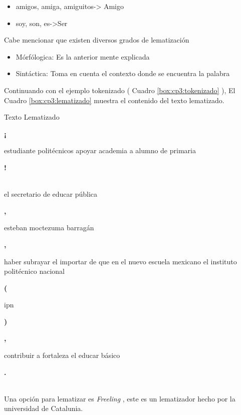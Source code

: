 	\begin{itemize}
		\item amigos, amiga, amiguitos-> Amigo
		\item soy, son, es->Ser
	\end{itemize}

Cabe mencionar que existen diversos grados de lematización

	\begin{itemize}
		\item Mórfólogica: Es la anterior mente explicada
		\item Sintáctica: Toma en cuenta el contexto donde se encuentra la palabra

	\end{itemize}

Continuando con el ejemplo tokenizado ( Cuadro \ref{box:cp3:tokenizado} ), El Cuadro \ref{box:cp3:lematizado} muestra el contenido del texto lematizado.\\

\begin{mygraybox}[label={box:cp3:lematizado}]{Texto Lematizado} 
\begin{large}\textbf{¡}\end{large} estudiante politécnicos apoyar academia a alumno de primaria \begin{large}\textbf{!}\end{large}\\

el secretario de educar pública \begin{Large}\textbf{,}\end{Large} esteban moctezuma barragán \begin{Large}\textbf{,}\end{Large} haber subrayar el importar  de que en el nuevo escuela mexicano el instituto politécnico nacional \begin{Large}\textbf{(}\end{Large} ipn \begin{Large}\textbf{)}\end{Large} \begin{Large}\textbf{,}\end{Large} contribuir a fortaleza el educar básico \begin{Large}\textbf{.}\end{Large}
\end{mygraybox}
\ \\
Una opción para lematizar es \textit{Freeling} \citep{CT18}, este es un lematizador hecho por la
universidad de Catalunia.

